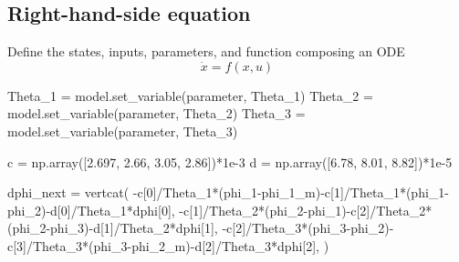 \documentclass[
  letterpaper,
  DIV=11,
  numbers=noendperiod,
  oneside]{scrartcl}
\newenvironment{Shaded}{\begin{snugshade}}{\end{snugshade}}
\newcommand{\DecValTok}[1]{\textcolor[rgb]{0.68,0.00,0.00}{#1}}
\newcommand{\FloatTok}[1]{\textcolor[rgb]{0.68,0.00,0.00}{#1}}
\newcommand{\NormalTok}[1]{\textcolor[rgb]{0.00,0.23,0.31}{#1}}
\newcommand{\OperatorTok}[1]{\textcolor[rgb]{0.37,0.37,0.37}{#1}}
\newcommand{\StringTok}[1]{\textcolor[rgb]{0.13,0.47,0.30}{#1}}
\begin{document}
\subsection{Right-hand-side equation}\label{right-hand-side-equation}

Define the states, inputs, parameters, and function composing an ODE
\[\dot{x} = f(x, u)\]

\begin{Shaded}
\begin{Highlighting}[numbers=left,,]
\NormalTok{Theta\_1 }\OperatorTok{=}\NormalTok{ model.set\_variable(}\StringTok{\textquotesingle{}parameter\textquotesingle{}}\NormalTok{, }\StringTok{\textquotesingle{}Theta\_1\textquotesingle{}}\NormalTok{) }
\NormalTok{Theta\_2 }\OperatorTok{=}\NormalTok{ model.set\_variable(}\StringTok{\textquotesingle{}parameter\textquotesingle{}}\NormalTok{, }\StringTok{\textquotesingle{}Theta\_2\textquotesingle{}}\NormalTok{)}
\NormalTok{Theta\_3 }\OperatorTok{=}\NormalTok{ model.set\_variable(}\StringTok{\textquotesingle{}parameter\textquotesingle{}}\NormalTok{, }\StringTok{\textquotesingle{}Theta\_3\textquotesingle{}}\NormalTok{)}

\NormalTok{c }\OperatorTok{=}\NormalTok{ np.array([}\FloatTok{2.697}\NormalTok{,  }\FloatTok{2.66}\NormalTok{,  }\FloatTok{3.05}\NormalTok{, }\FloatTok{2.86}\NormalTok{])}\OperatorTok{*}\FloatTok{1e{-}3}
\NormalTok{d }\OperatorTok{=}\NormalTok{ np.array([}\FloatTok{6.78}\NormalTok{,  }\FloatTok{8.01}\NormalTok{,  }\FloatTok{8.82}\NormalTok{])}\OperatorTok{*}\FloatTok{1e{-}5}

\NormalTok{dphi\_next }\OperatorTok{=}\NormalTok{ vertcat(}
    \OperatorTok{{-}}\NormalTok{c[}\DecValTok{0}\NormalTok{]}\OperatorTok{/}\NormalTok{Theta\_1}\OperatorTok{*}\NormalTok{(phi\_1}\OperatorTok{{-}}\NormalTok{phi\_1\_m)}\OperatorTok{{-}}\NormalTok{c[}\DecValTok{1}\NormalTok{]}\OperatorTok{/}\NormalTok{Theta\_1}\OperatorTok{*}\NormalTok{(phi\_1}\OperatorTok{{-}}\NormalTok{phi\_2)}\OperatorTok{{-}}\NormalTok{d[}\DecValTok{0}\NormalTok{]}\OperatorTok{/}\NormalTok{Theta\_1}\OperatorTok{*}\NormalTok{dphi[}\DecValTok{0}\NormalTok{],}
    \OperatorTok{{-}}\NormalTok{c[}\DecValTok{1}\NormalTok{]}\OperatorTok{/}\NormalTok{Theta\_2}\OperatorTok{*}\NormalTok{(phi\_2}\OperatorTok{{-}}\NormalTok{phi\_1)}\OperatorTok{{-}}\NormalTok{c[}\DecValTok{2}\NormalTok{]}\OperatorTok{/}\NormalTok{Theta\_2}\OperatorTok{*}\NormalTok{(phi\_2}\OperatorTok{{-}}\NormalTok{phi\_3)}\OperatorTok{{-}}\NormalTok{d[}\DecValTok{1}\NormalTok{]}\OperatorTok{/}\NormalTok{Theta\_2}\OperatorTok{*}\NormalTok{dphi[}\DecValTok{1}\NormalTok{],}
    \OperatorTok{{-}}\NormalTok{c[}\DecValTok{2}\NormalTok{]}\OperatorTok{/}\NormalTok{Theta\_3}\OperatorTok{*}\NormalTok{(phi\_3}\OperatorTok{{-}}\NormalTok{phi\_2)}\OperatorTok{{-}}\NormalTok{c[}\DecValTok{3}\NormalTok{]}\OperatorTok{/}\NormalTok{Theta\_3}\OperatorTok{*}\NormalTok{(phi\_3}\OperatorTok{{-}}\NormalTok{phi\_2\_m)}\OperatorTok{{-}}\NormalTok{d[}\DecValTok{2}\NormalTok{]}\OperatorTok{/}\NormalTok{Theta\_3}\OperatorTok{*}\NormalTok{dphi[}\DecValTok{2}\NormalTok{],}
\NormalTok{)}


\end{Highlighting}
\end{Shaded}
\end{document}
